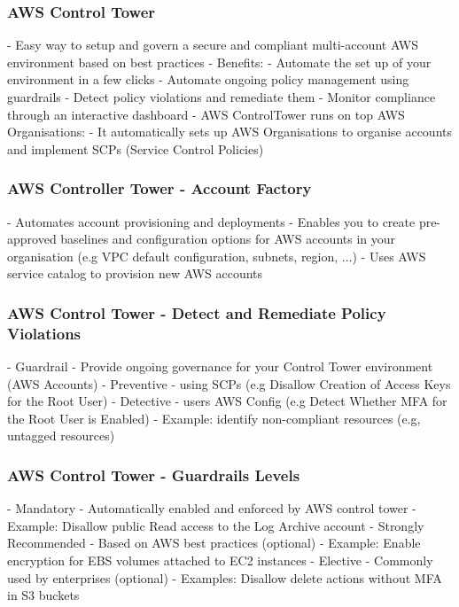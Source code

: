 \documentclass[11pt]{book}
\begin{document}
    \subsubsection{AWS Control Tower}
    - Easy way to setup and govern a secure and compliant multi-account AWS environment based on best practices
    - Benefits:
    - Automate the set up of your environment in a few clicks
    - Automate ongoing policy management using guardrails
    - Detect policy violations and remediate them
    - Monitor compliance through an interactive dashboard
    - AWS ControlTower runs on top AWS Organisations:
    - It automatically sets up AWS Organisations to organise accounts and implement SCPs (Service Control Policies)

    \subsubsection{AWS Controller Tower - Account Factory}
    - Automates account provisioning and deployments
    - Enables you to create pre-approved baselines and configuration options for AWS accounts in your organisation (e.g VPC default configuration, subnets, region, ...)
    - Uses AWS service catalog to provision new AWS accounts

    \subsubsection{AWS Control Tower - Detect and Remediate Policy Violations}
    - Guardrail
    - Provide ongoing governance for your Control Tower environment (AWS Accounts)
    - Preventive - using SCPs (e.g Disallow Creation of Access Keys for the Root User)
    - Detective - users AWS Config (e.g Detect Whether MFA for the Root User is Enabled)
    - Example: identify non-compliant resources (e.g, untagged resources)


    \subsubsection{AWS Control Tower - Guardrails Levels}
    - Mandatory
    - Automatically enabled and enforced by AWS control tower
    - Example: Disallow public Read access to the Log Archive account
    - Strongly Recommended
    - Based on AWS best practices (optional)
    - Example: Enable encryption for EBS volumes attached to EC2 instances
    - Elective
    - Commonly used by enterprises (optional)
    - Examples: Disallow delete actions without MFA in S3 buckets
\end{document}
